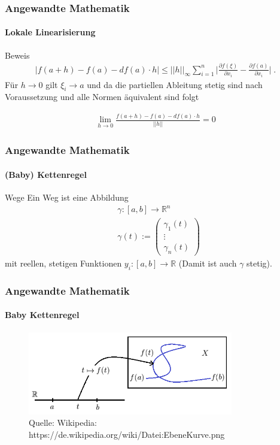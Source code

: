 \documentclass{beamer}
\begin{document}
\begin{frame}
    \frametitle{Angewandte Mathematik}
\framesubtitle{Lokale Linearisierung}
    \begin{block}{Beweis}
\begin{align*}
| f(a + h) - f(a) - df(a) \cdot h |  \leq || h ||_{\infty}  \sum_{i=1}^n  \biggl| \frac{\partial  f(\xi) }{\partial x_i} -    \frac{\partial  f(a) }{\partial x_i}   \biggr | \; . 
\end{align*} 
Für $h \to 0$ gilt $\xi_i \to a$ und da die partiellen Ableitung stetig sind nach Voraussetzung und alle Normen äquivalent sind folgt

\begin{align*}
\lim_{h \to 0} \frac{ f(a + h) - f(a) - df(a) \cdot h}{||h||} = 0 
\end{align*} 

\end{block}

 \end{frame}

\begin{frame}
    \frametitle{Angewandte Mathematik}
\framesubtitle{(Baby) Kettenregel}
    \begin{block}{Wege}
Ein Weg ist eine Abbildung  
\begin{align*}
& \gamma:  [a,b] \to \mathbb{R}^n \\
& \gamma (t) :=  \begin{pmatrix} \gamma_1(t) \\ \vdots \\ \gamma_n(t) \end{pmatrix}
\end{align*}
mit reellen, stetigen Funktionen $y_i : [a,b] \to \mathbb{R}$ (Damit ist auch $\gamma$ stetig).
\end{block}

 \end{frame}

\begin{frame}
    \frametitle{Angewandte Mathematik}
\framesubtitle{Baby Kettenregel}
\begin{figure}[H]
      \centering
    \includegraphics[width=0.8\textwidth]{images/EbeneKurve}
      \caption{Quelle: Wikipedia: https://de.wikipedia.org/wiki/Datei:EbeneKurve.png}
\end{figure}

 \end{frame}
\end{document}
